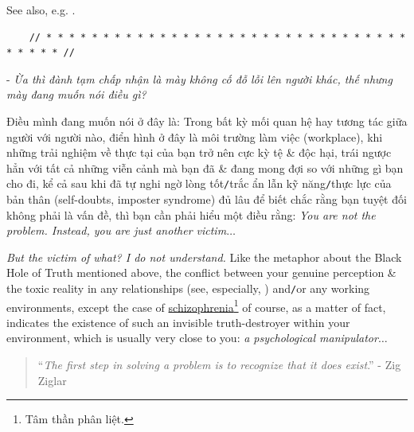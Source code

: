\documentclass[12pt]{article}
\begin{document}
See also, e.g. \cite{NASEM2020,NhuTrang2020}.

\begin{verbatim}
	// * * * * * * * * * * * * * * * * * * * * * * * * * * * * * * * * * * * * * //
\end{verbatim}

\noindent
{} - {\it Ừa thì đành tạm chấp nhận là mày không cố đỗ lỗi lên người khác, thế nhưng mày đang muốn nói điều gì?}

Điều mình đang muốn nói ở đây là: Trong bất kỳ mối quan hệ hay tương tác giữa người với người nào, điển hình ở đây là môi trường làm việc (workplace), khi những trải nghiệm về thực tại của bạn trở nên cực kỳ tệ \& độc hại, trái ngược hẳn với tất cả những viễn cảnh mà bạn đã \& đang mong đợi so với những gì bạn cho đi, kể cả sau khi đã tự nghi ngờ lòng tốt{\tt/}trắc ẩn lẫn kỹ năng{\tt/}thực lực của bản thân (self-doubts, imposter syndrome) đủ lâu để biết chắc rằng bạn tuyệt đối không phải là vấn đề, thì bạn cần phải hiểu một điều rằng: {\it You are not the problem. Instead, you are just another victim}$\ldots$

{\it But the victim of what? I do not understand.} Like the metaphor about the Black Hole of Truth mentioned above, the conflict between your genuine perception \& the toxic reality in any relationships (see, especially, \cite{Bancroft_why_he_do,Bancroft_why_he_do_VN}) and{\tt/}or any working environments, except the case of \href{https://en.wikipedia.org/wiki/Schizophrenia}{schizophrenia}\footnote{Tâm thần phân liệt.} of course, as a matter of fact, indicates the existence of such an invisible truth-destroyer within your environment, which is usually very close to you: {\it a psychological manipulator}$\ldots$

\begin{quotation}
	``{\it The first step in solving a problem is to recognize that it does exist}.'' - Zig Ziglar
\end{quotation}
\end{document}
